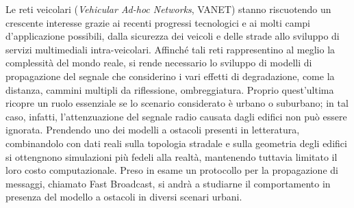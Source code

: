
Le reti veicolari (\textit{Vehicular Ad-hoc Networks}, VANET) stanno riscuotendo un crescente interesse
grazie ai recenti progressi tecnologici e ai molti campi d'applicazione possibili, dalla sicurezza dei veicoli
e delle strade allo sviluppo di servizi multimediali intra-veicolari.
Affinché tali reti rappresentino al meglio la complessità del mondo reale, si rende necessario lo sviluppo di modelli di propagazione del segnale
che considerino i vari effetti di degradazione, come la distanza, cammini multipli da riflessione, ombreggiatura.
Proprio quest'ultima ricopre un ruolo essenziale se lo scenario considerato è urbano o suburbano; in tal caso, infatti,
l'attenzuazione del segnale radio causata dagli edifici non può essere ignorata.
Prendendo uno dei modelli a ostacoli presenti in letteratura,
combinandolo con dati reali sulla topologia stradale e sulla geometria degli edifici
si ottengnono simulazioni più fedeli alla realtà, mantenendo tuttavia limitato il loro costo computazionale.
Preso in esame un protocollo per la propagazione di messaggi, chiamato Fast Broadcast,
si andrà a studiarne il comportamento in presenza del modello a ostacoli in diversi scenari urbani.
%
